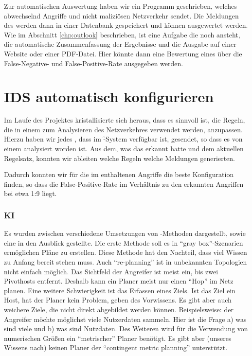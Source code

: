 Zur automatischen Auswertung haben wir ein Programm geschrieben,
welches abwechselnd Angriffe und nicht maliziösen Netzverkehr
sendet. Die Meldungen des  werden dann in einer Datenbank
gespeichert und können ausgewertet werden. Wie im Abschnitt
\ref{chp:outlook} beschrieben, ist eine Aufgabe die noch ansteht, die
automatische Zusammenfassung der Ergebnisse und die Ausgabe auf einer
Website oder einer PDF-Datei. Hier könnte dann eine Bewertung eines
 über die False-Negative- und False-Positive-Rate ausgegeben
werden. 

\section{IDS automatisch konfigurieren}

Im Laufe des Projektes kristallisierte sich heraus, dass es sinnvoll
ist, die Regeln, die in einem  zum Analysieren des Netzverkehres
verwendet werden, anzupassen. Hierzu haben wir jedes , dass im
\f-System verfügbar ist, gesendet, so dass es von einem
 analysiert worden ist. Aus dem, was das  erkannt hatte 
und dem aktuellen Regelsatz, konnten wir ableiten welche Regeln welche
Meldungen generierten. 

Dadurch konnten wir für die im  enthaltenen Angriffe die
beste Konfiguration finden, so dass die False-Positive-Rate im
Verhältnis zu den erkannten Angriffen bei etwa 1:9 liegt. 

\subsubsection{KI}
Es wurden zwischen verschiedene Umsetzungen von -Methoden
dargestellt, sowie eine in den Ausblick gestellte. Die erste Methode
soll es in \enquote{gray box}-Szenarien ermöglichen Pläne zu
erstellen. Diese Methode hat den Nachteil, dass viel Wissen zu Anfang
bereit stehen muss.  Auch \enquote{re-planning} ist in unbekannten
Topologien nicht einfach möglich. Das Sichtfeld der Angreifer ist
meist ein, bis zwei Pivothosts entfernt. Deshalb kann ein Planer
meist nur einen \enquote{Hop} im Netz planen. Eine weitere Schwierigkeit ist
das Erfassen eines Ziels. Ist das Ziel ein Host, hat der Planer kein
Problem, geben des Vorwissens. Es gibt aber auch weichere Ziele, die
nicht direkt abgebildet werden können. Beispielsweise: der Angreifer
möchte möglichst viele Nutzerdaten sammeln.  Hier ist die Frage a) was
sind viele und b) was sind Nutzdaten.  Des Weiteren wird für die
Verwendung von numerischen Größen ein \enquote{metrischer} Planer
benötigt. Es gibt aber (unseres Wissens nach) keinen Planer der
\enquote{contingent metric planning} unterstützt.

